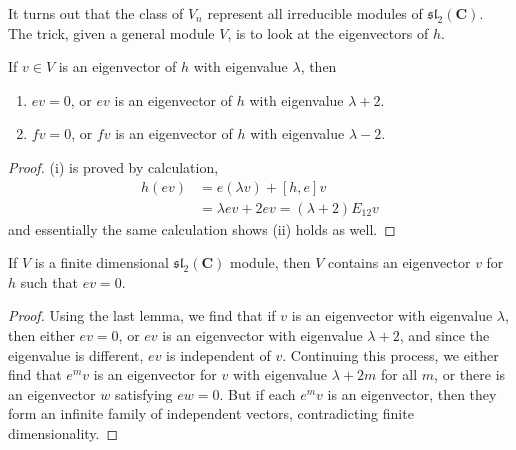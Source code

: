 It turns out that the class of $V_n$ represent all irreducible modules of $\mathfrak{sl}_2(\mathbf{C})$. The trick, given a general module $V$, is to look at the eigenvectors of $h$.

\begin{lemma}
    If $v \in V$ is an eigenvector of $h$ with eigenvalue $\lambda$, then
    \begin{enumerate}
        \item[(i)] $ev = 0$, or $ev$ is an eigenvector of $h$ with eigenvalue $\lambda + 2$.
        \item[(ii)] $fv = 0$, or $fv$ is an eigenvector of $h$ with eigenvalue $\lambda - 2$.
    \end{enumerate}
\end{lemma}
\begin{proof}
    (i) is proved by calculation,
    \begin{align*}
        h(ev) &= e(\lambda v) + [h, e] v\\
        &= \lambda ev + 2ev = (\lambda + 2) E_{12} v
    \end{align*}
    and essentially the same calculation shows (ii) holds as well.
\end{proof}

\begin{lemma}
    If $V$ is a finite dimensional $\mathfrak{sl}_2(\mathbf{C})$ module, then $V$ contains an eigenvector $v$ for $h$ such that $ev = 0$.
\end{lemma}
\begin{proof}
    Using the last lemma, we find that if $v$ is an eigenvector with eigenvalue $\lambda$, then either $ev = 0$, or $ev$ is an eigenvector with eigenvalue $\lambda + 2$, and since the eigenvalue is different, $ev$ is independent of $v$. Continuing this process, we either find that $e^m v$ is an eigenvector for $v$ with eigenvalue $\lambda + 2m$ for all $m$, or there is an eigenvector $w$ satisfying $ew = 0$. But if each $e^m v$ is an eigenvector, then they form an infinite family of independent vectors, contradicting finite dimensionality.
\end{proof}


